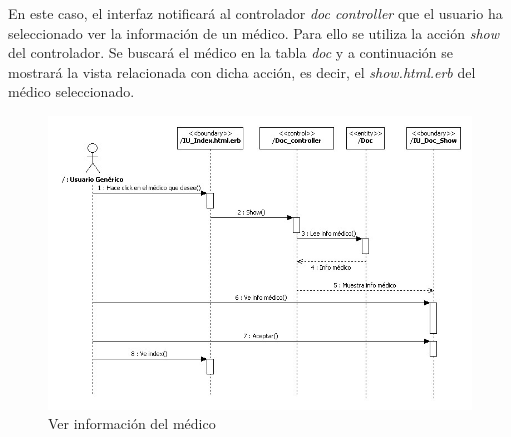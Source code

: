 \documentclass[a4paper,oneside,11pt]{book}
\begin{document}
			En este caso, el interfaz notificará al controlador \textit{doc controller} que el usuario ha seleccionado ver la información de un médico. Para ello se utiliza la acción \textit{show} del controlador. Se buscará el médico en la tabla \textit{doc} y a continuación se mostrará la vista relacionada con dicha acción, es decir, el \textit{show.html.erb} del médico seleccionado.
			\begin{figure}[H]
			  \centering
			    \includegraphics[width=16cm]{img/jpg/secuencia/02_VerInfoMedico.jpg}
			  \caption{Ver información del médico}
			  \label{fig:sec_general_verinfomedico}
			\end{figure}
			
		

\end{document}
